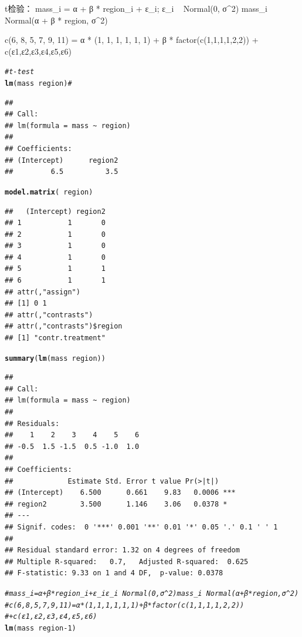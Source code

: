 \documentclass{article}\usepackage[]{graphicx}\usepackage[]{color}
\makeatletter
\newcommand{\hlnum}[1]{\textcolor[rgb]{0.686,0.059,0.569}{#1}}%
\newcommand{\hlcom}[1]{\textcolor[rgb]{0.678,0.584,0.686}{\textit{#1}}}%
\newcommand{\hlopt}[1]{\textcolor[rgb]{0,0,0}{#1}}%
\newcommand{\hlstd}[1]{\textcolor[rgb]{0.345,0.345,0.345}{#1}}%
\newcommand{\hlkwd}[1]{\textcolor[rgb]{0.737,0.353,0.396}{\textbf{#1}}}%
\newenvironment{kframe}{%
 \def\at@end@of@kframe{}%
 \ifinner\ifhmode%
  \def\at@end@of@kframe{\end{minipage}}%
  \begin{minipage}{\columnwidth}%
 \fi\fi%
 \def\FrameCommand##1{\hskip\@totalleftmargin \hskip-\fboxsep
 \colorbox{shadecolor}{##1}\hskip-\fboxsep
     \hskip-\linewidth \hskip-\@totalleftmargin \hskip\columnwidth}%
 \MakeFramed {\advance\hsize-\width
   \@totalleftmargin\z@ \linewidth\hsize
   \@setminipage}}%
 {\par\unskip\endMakeFramed%
 \at@end@of@kframe}
\newenvironment{knitrout}{}{} %
\makeatother
\begin{document}
t检验：
 mass_i = α + β * region_i + ε_i; ε_i ~ Normal(0, σ^2)
 mass_i ~ Normal(α + β * region, σ^2)
 
c(6, 8, 5, 7, 9, 11) = α * (1, 1, 1, 1, 1, 1) + β * factor(c(1,1,1,1,2,2)) + c(ε1,ε2,ε3,ε4,ε5,ε6)

\begin{knitrout}
\color{fgcolor}\begin{kframe}
\begin{alltt}
\hlcom{# t-test}
\hlkwd{lm}\hlstd{(mass} \hlopt{~} \hlstd{region)}  \hlcom{# }
\end{alltt}
\begin{verbatim}
## 
## Call:
## lm(formula = mass ~ region)
## 
## Coefficients:
## (Intercept)      region2  
##         6.5          3.5
\end{verbatim}
\begin{alltt}
\hlkwd{model.matrix}\hlstd{(}\hlopt{~}\hlstd{region)}
\end{alltt}
\begin{verbatim}
##   (Intercept) region2
## 1           1       0
## 2           1       0
## 3           1       0
## 4           1       0
## 5           1       1
## 6           1       1
## attr(,"assign")
## [1] 0 1
## attr(,"contrasts")
## attr(,"contrasts")$region
## [1] "contr.treatment"
\end{verbatim}
\begin{alltt}
\hlkwd{summary}\hlstd{(}\hlkwd{lm}\hlstd{(mass} \hlopt{~} \hlstd{region))}
\end{alltt}
\begin{verbatim}
## 
## Call:
## lm(formula = mass ~ region)
## 
## Residuals:
##    1    2    3    4    5    6 
## -0.5  1.5 -1.5  0.5 -1.0  1.0 
## 
## Coefficients:
##             Estimate Std. Error t value Pr(>|t|)    
## (Intercept)    6.500      0.661    9.83   0.0006 ***
## region2        3.500      1.146    3.06   0.0378 *  
## ---
## Signif. codes:  0 '***' 0.001 '**' 0.01 '*' 0.05 '.' 0.1 ' ' 1
## 
## Residual standard error: 1.32 on 4 degrees of freedom
## Multiple R-squared:   0.7,	Adjusted R-squared:  0.625 
## F-statistic: 9.33 on 1 and 4 DF,  p-value: 0.0378
\end{verbatim}
\begin{alltt}
\hlcom{# mass_i =α+β*region_i+ε_i ε_i~Normal(0,σ^2) mass_i~Normal(α+β*region,σ^2)}
\hlcom{# c(6, 8, 5, 7, 9, 11) = α * (1, 1, 1, 1, 1, 1) + β * factor(c(1,1,1,1,2,2))}
\hlcom{# + c(ε1,ε2,ε3,ε4,ε5,ε6)}
\hlkwd{lm}\hlstd{(mass} \hlopt{~} \hlstd{region} \hlopt{-} \hlnum{1}\hlstd{)}

\end{alltt}
\end{kframe}
\end{knitrout}
\end{document}
